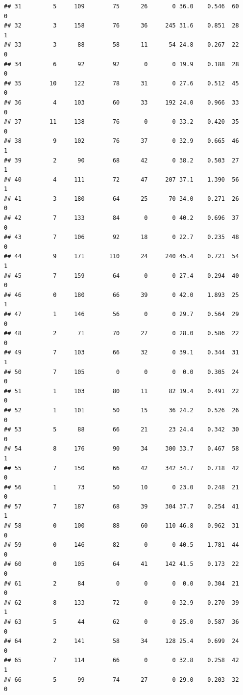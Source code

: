 \documentclass[11pt, a4paper]{article}\usepackage[]{graphicx}\usepackage[]{xcolor}
\makeatletter
\newenvironment{kframe}{%
 \def\at@end@of@kframe{}%
 \ifinner\ifhmode%
  \def\at@end@of@kframe{\end{minipage}}%
  \begin{minipage}{\columnwidth}%
 \fi\fi%
 \def\FrameCommand##1{\hskip\@totalleftmargin \hskip-\fboxsep
 \colorbox{shadecolor}{##1}\hskip-\fboxsep
     \hskip-\linewidth \hskip-\@totalleftmargin \hskip\columnwidth}%
 \MakeFramed {\advance\hsize-\width
   \@totalleftmargin\z@ \linewidth\hsize
   \@setminipage}}%
 {\par\unskip\endMakeFramed%
 \at@end@of@kframe}
\newenvironment{knitrout}{}{} %
\makeatother
\begin{document}
\begin{knitrout}
\begin{kframe}
\begin{verbatim}
## 31         5     109        75      26       0 36.0    0.546  60    0
## 32         3     158        76      36     245 31.6    0.851  28    1
## 33         3      88        58      11      54 24.8    0.267  22    0
## 34         6      92        92       0       0 19.9    0.188  28    0
## 35        10     122        78      31       0 27.6    0.512  45    0
## 36         4     103        60      33     192 24.0    0.966  33    0
## 37        11     138        76       0       0 33.2    0.420  35    0
## 38         9     102        76      37       0 32.9    0.665  46    1
## 39         2      90        68      42       0 38.2    0.503  27    1
## 40         4     111        72      47     207 37.1    1.390  56    1
## 41         3     180        64      25      70 34.0    0.271  26    0
## 42         7     133        84       0       0 40.2    0.696  37    0
## 43         7     106        92      18       0 22.7    0.235  48    0
## 44         9     171       110      24     240 45.4    0.721  54    1
## 45         7     159        64       0       0 27.4    0.294  40    0
## 46         0     180        66      39       0 42.0    1.893  25    1
## 47         1     146        56       0       0 29.7    0.564  29    0
## 48         2      71        70      27       0 28.0    0.586  22    0
## 49         7     103        66      32       0 39.1    0.344  31    1
## 50         7     105         0       0       0  0.0    0.305  24    0
## 51         1     103        80      11      82 19.4    0.491  22    0
## 52         1     101        50      15      36 24.2    0.526  26    0
## 53         5      88        66      21      23 24.4    0.342  30    0
## 54         8     176        90      34     300 33.7    0.467  58    1
## 55         7     150        66      42     342 34.7    0.718  42    0
## 56         1      73        50      10       0 23.0    0.248  21    0
## 57         7     187        68      39     304 37.7    0.254  41    1
## 58         0     100        88      60     110 46.8    0.962  31    0
## 59         0     146        82       0       0 40.5    1.781  44    0
## 60         0     105        64      41     142 41.5    0.173  22    0
## 61         2      84         0       0       0  0.0    0.304  21    0
## 62         8     133        72       0       0 32.9    0.270  39    1
## 63         5      44        62       0       0 25.0    0.587  36    0
## 64         2     141        58      34     128 25.4    0.699  24    0
## 65         7     114        66       0       0 32.8    0.258  42    1
## 66         5      99        74      27       0 29.0    0.203  32    0

\end{verbatim}
\end{kframe}
\end{knitrout}
\end{document}
